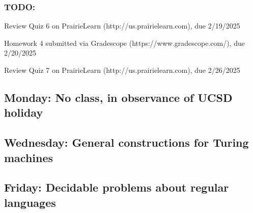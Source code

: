 \vspace{-20pt}

\subsubsection*{TODO:}
\begin{list}{\itemsep-10pt}
    \item Review Quiz 6 on PrairieLearn (http://us.prairielearn.com), due 2/19/2025
    \item Homework 4 submitted via Gradescope (https://www.gradescope.com/), due 2/20/2025
    \item Review Quiz 7 on PrairieLearn (http://us.prairielearn.com), due 2/26/2025
\end{list}

\newpage

\subsection*{Monday: No class, in observance of UCSD holiday}
\subsection*{Wednesday: General constructions for Turing machines}





\newpage
\subsection*{Friday: Decidable problems about regular languages}





